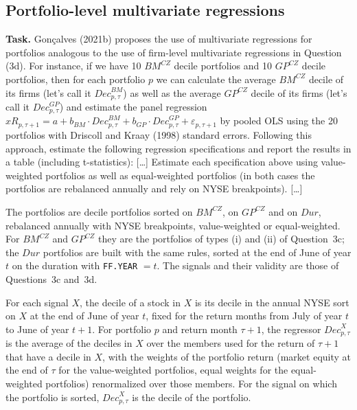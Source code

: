 \documentclass[11pt]{article}
\makeatletter
\newcommand{\xR}{\mathit{xR}}
\newcommand{\BM}{\mathit{BM}}
\newcommand{\GP}{\mathit{GP}}
\newcommand{\Dur}{\mathit{Dur}}
\newcommand{\task}[1]{\par\if@nobreak\else\needspace{5\baselineskip}\fi\medskip\noindent
  \begin{minipage}{\linewidth}\textbf{Task.} #1\end{minipage}\par   %
  \nopagebreak\medskip\@afterheading}   %
\makeatother
\begin{document}
\subsection{Portfolio-level multivariate regressions}

\task{Gon\c{c}alves (2021b) proposes the use of multivariate regressions for portfolios
analogous to the use of firm-level multivariate regressions in Question (3d). For instance, if
we have 10 $\BM^{CZ}$ decile portfolios and 10 $\GP^{CZ}$ decile portfolios, then for each
portfolio $p$ we can calculate the average $\BM^{CZ}$ decile of its firms (let's call it
$\mathit{Dec}^{\BM}_{p,\tau}$) as well as the average $\GP^{CZ}$ decile of its firms (let's
call it $\mathit{Dec}^{\GP}_{p,\tau}$) and estimate the panel regression
$\xR_{p,\tau+1} = a + b_{\BM} \cdot \mathit{Dec}^{\BM}_{p,\tau}
+ b_{\GP} \cdot \mathit{Dec}^{\GP}_{p,\tau} + \varepsilon_{p,\tau+1}$ by pooled OLS using the
20 portfolios with Driscoll and Kraay (1998) standard errors. Following this approach,
estimate the following regression specifications and report the results in a table
(including t-statistics): [\dots] Estimate each specification above using value-weighted
portfolios as well as equal-weighted portfolios (in both cases the portfolios are rebalanced
annually and rely on NYSE breakpoints). [\dots]}

The portfolios are decile portfolios sorted on $\BM^{CZ}$, on $\GP^{CZ}$ and on $\Dur$,
rebalanced annually with NYSE breakpoints, value-weighted or equal-weighted. For $\BM^{CZ}$
and $\GP^{CZ}$ they are the portfolios of types (i) and (ii) of Question~3c; the $\Dur$
portfolios are built with the same rules, sorted at the end of June of year $t$ on the
duration with \texttt{FF.YEAR} $= t$. The signals and their validity are those of
Questions~3c and~3d.

For each signal $X$, the decile of a stock in $X$ is its decile in the annual NYSE sort on
$X$ at the end of June of year $t$, fixed for the return months from July of year $t$ to June
of year $t+1$. For portfolio $p$ and return month $\tau+1$, the regressor
$\mathit{Dec}^{X}_{p,\tau}$ is the average of the deciles in $X$ over the members used for
the return of $\tau+1$ that have a decile in $X$, with the weights of the portfolio return
(market equity at the end of $\tau$ for the value-weighted portfolios, equal weights for the
equal-weighted portfolios) renormalized over those members. For the signal on which the
portfolio is sorted, $\mathit{Dec}^{X}_{p,\tau}$ is the decile of the portfolio.
\end{document}
